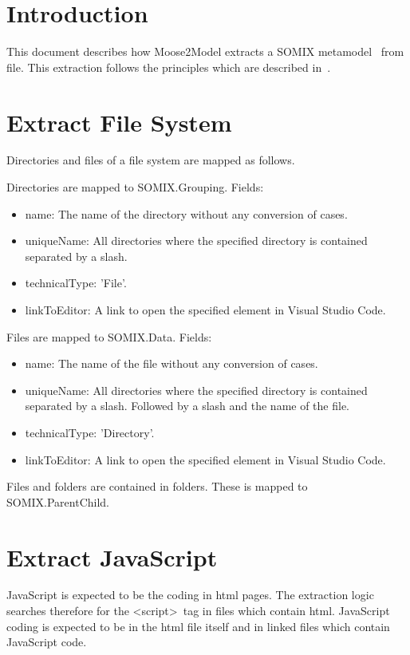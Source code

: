 \documentclass[preprint,12pt]{elsarticle}
\begin{document}

\section{Introduction}
\label{intro}
This document describes how Moose2Model extracts a SOMIX metamodel~\cite{r_SOMIX} from file. 
This extraction follows the principles which are described in~\cite{r_Metamodel_Preprint_2}. 

\section{Extract File System}
Directories and files of a file system are mapped as follows.

Directories are mapped to SOMIX.Grouping. Fields:
\begin{itemize}
\item name: The name of the directory without any conversion of cases.
\item uniqueName: All directories where the specified directory is contained separated by a slash.
\item technicalType: 'File'.
\item linkToEditor: A link to open the specified element in Visual Studio Code.
\end{itemize}

Files are mapped to SOMIX.Data. Fields:
\begin{itemize}
\item name: The name of the file without any conversion of cases.
\item uniqueName: All directories where the specified directory is contained separated by a slash. Followed by a slash and the name of the file.
\item technicalType: 'Directory'.
\item linkToEditor: A link to open the specified element in Visual Studio Code.
\end{itemize}

Files and folders are contained in folders. These is mapped to SOMIX.ParentChild.

\section{Extract JavaScript}
JavaScript is expected to be the coding in html pages. The extraction logic searches therefore for the \textless script\textgreater~tag in files which contain html. JavaScript coding is expected to be in the html file itself and in linked files which contain JavaScript code.
\end{document}

